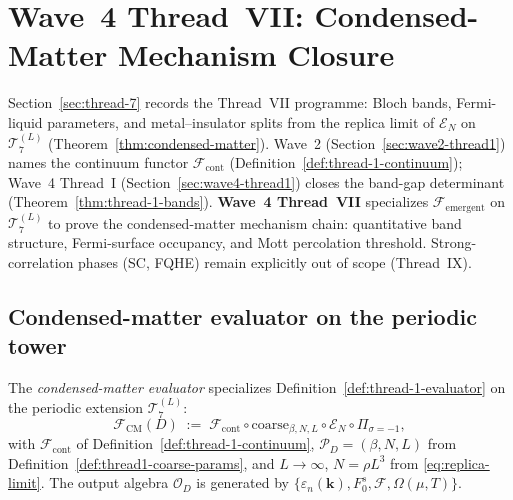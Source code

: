 \section{Wave~4 Thread~VII: Condensed-Matter Mechanism Closure}
\label{sec:wave4-thread7}

Section~\ref{sec:thread-7} records the Thread~VII programme: Bloch bands,
Fermi-liquid parameters, and metal--insulator splits from the replica limit of
$\mathcal{E}_N$ on $\mathcal{T}_7^{(L)}$ (Theorem~\ref{thm:condensed-matter}).
Wave~2 (Section~\ref{sec:wave2-thread1}) names the continuum functor
$\mathcal{F}_{\mathrm{cont}}$ (Definition~\ref{def:thread-1-continuum}); Wave~4
Thread~I (Section~\ref{sec:wave4-thread1}) closes the band-gap determinant
(Theorem~\ref{thm:thread-1-bands}). \textbf{Wave~4 Thread~VII} specializes
$\mathcal{F}_{\mathrm{emergent}}$ on $\mathcal{T}_7^{(L)}$ to prove the
condensed-matter mechanism chain: quantitative band structure, Fermi-surface
occupancy, and Mott percolation threshold. Strong-correlation phases (SC, FQHE)
remain explicitly out of scope (Thread~IX).

\subsection{Condensed-matter evaluator on the periodic tower}
\label{sec:wave4-thread7:evaluator}

\begin{definition}
\label{def:thread-7-evaluator}
The \emph{condensed-matter evaluator} specializes
Definition~\ref{def:thread-1-evaluator} on the periodic extension
$\mathcal{T}_7^{(L)}$:
\begin{equation}\label{eq:thread7-evaluator}
  \mathcal{F}_{\mathrm{CM}}(D)
  \;:=\;
  \mathcal{F}_{\mathrm{cont}}
  \circ
  \mathrm{coarse}_{\beta,N,L}
  \circ
  \mathcal{E}_N
  \circ
  \Pi_{\sigma=-1},
\end{equation}
with $\mathcal{F}_{\mathrm{cont}}$ of Definition~\ref{def:thread-1-continuum},
$\mathcal{P}_D=(\beta,N,L)$ from Definition~\ref{def:thread1-coarse-params},
and $L\to\infty$, $N=\rho L^3$ from \eqref{eq:replica-limit}. The output
algebra $\mathcal{O}_D$ is generated by
$\{\varepsilon_n(\mathbf{k}),F_0^s,\mathcal{F},\Omega(\mu,T)\}$.
\end{definition}

